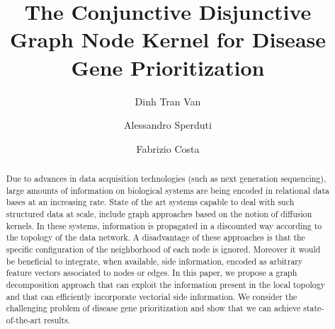 \documentclass[review]{elsarticle}
\begin{document}
\begin{frontmatter}

\title{The Conjunctive Disjunctive Graph Node Kernel for Disease Gene Prioritization}

\author{Dinh Tran Van}
\author{Alessandro Sperduti}
\address{Department of Mathematics, Padova University, Trieste, 63, 35121 Padova, Italy}
\author{Fabrizio Costa}
\address{Department of Computer Science, University of Exeter Exeter EX4 4QF, UK}




\begin{abstract}
Due to advances in data acquisition technologies (such as next generation sequencing), large amounts of information on biological systems are being encoded in relational data bases at an increasing rate. State of the art systems capable to deal with such structured data at scale,  include graph approaches based on the notion of diffusion kernels. In these systems, information is propagated in a discounted way according to the topology of the data network. A disadvantage of these approaches is that the specific configuration of the neighborhood of each node is ignored. Moreover it would be beneficial to integrate, when available, side information, encoded as arbitrary feature vectors associated to nodes or edges.
In this paper, we propose a graph decomposition approach that can exploit the information present in the local topology and that can efficiently incorporate vectorial side information. We consider the challenging problem of disease gene prioritization and show that we can achieve  state-of-the-art results.


\end{abstract}
\end{frontmatter}
\end{document}
